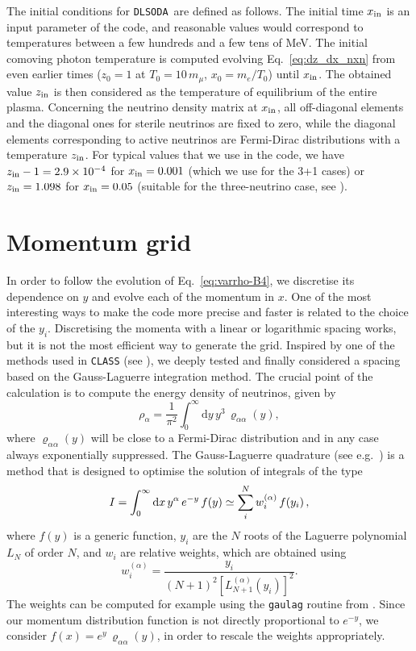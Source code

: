 \documentclass[notitlepage,showpacs,preprintnumbers,amsmath,amssymb,superscriptaddress,prd,onecolumn]{revtex4-1}
\newcommand{\e}[1]{\ensuremath{\times10^{#1}}}
\newcommand{\dlsoda}{\texttt{DLSODA}}
\begin{document}
The initial conditions for \dlsoda\ are defined as follows.
The initial time $x_{\rm in}$ is an input parameter of the code,
and reasonable values would correspond to temperatures between a few hundreds and a few tens of MeV.
The initial comoving photon temperature is computed evolving Eq.~\eqref{eq:dz_dx_nxn}
from even earlier times ($z_0=1$ at $T_0=10\, m_\mu$, $x_0=m_e/T_0$) until $x_{\rm in}$.
The obtained value $z_{\rm in}$ is then considered as the temperature of equilibrium
of the entire plasma. Concerning the neutrino density matrix at $x_{\rm in}$, all off-diagonal elements and the diagonal ones for sterile
neutrinos are fixed to zero, while the diagonal elements corresponding to active neutrinos are 
Fermi-Dirac distributions with a temperature $z_{\rm in}$.
For typical values that we use in the code,
we have $z_{\rm in}-1=2.9\e{-4}$ for $x_{\rm in}=0.001$ (which we use for the 3+1 cases)
or
$z_{\rm in} = 1.098$ for $x_{\rm in}=0.05$ (suitable for the three-neutrino case, see \cite{deSalas:2016ztq}).


\section{Momentum grid}
\label{ssec:momenta}
In order to follow the evolution of Eq.~\eqref{eq:varrho-B4}, we discretise its dependence on $y$ and evolve each of the momentum in $x$.
One of the most interesting ways to make the code more precise and faster is related to the choice of the $y_i$.
Discretising the momenta with a linear or logarithmic spacing works, but it is not the most efficient
way to generate the grid.
Inspired by one of the methods used in \texttt{CLASS} (see \cite{Lesgourgues:2011rh}),
we deeply tested and finally considered a spacing based on the Gauss-Laguerre integration method.
The crucial point of the calculation is to compute the energy density of neutrinos,
given by
%
\begin{equation}
\rho_\alpha
=
\frac{1}{\pi^2}
\int_0^\infty
\mathrm{d}y\, y^3\,\varrho_{\alpha\alpha}(y),
\end{equation}
%
where $\varrho_{\alpha\alpha}(y)$ will be close to a Fermi-Dirac distribution and in any case always exponentially suppressed.
The Gauss-Laguerre quadrature (see e.g.~\cite{NR})
is a method that is designed to optimise the solution of integrals of the type
\begin{equation}
I
=
\int_0^\infty
{\rm d}x\, y^\alpha\,e^{-y}\,f(y)
\simeq\sum_i^{N}w_i^{(\alpha)}\,f(y_i)
\,,
\end{equation}
where $f(y)$ is a generic function,
$y_i$ are the $N$ roots of the Laguerre polynomial $L_N$ of order $N$, and $w_i$ are relative weights,
 which are obtained using
\begin{equation}
w_i^{(\alpha)}=
\frac{y_i}{\left(N+1\right)^2\left[L^{(\alpha)}_{N+1}(y_i)\right]^2}.
\end{equation}
The weights can be computed for example using the \texttt{gaulag} routine from \cite{NR}.
Since our momentum distribution function is not directly proportional to $e^{-y}$,
we consider $f(x)=e^y\,\varrho_{\alpha\alpha}(y)$,
in order to rescale the weights appropriately.
\end{document}
